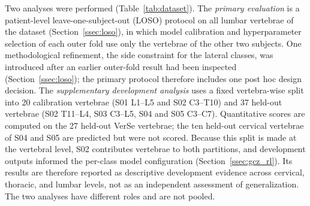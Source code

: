 \documentclass[5p,times,twocolumn,authoryear]{elsarticle}
\begin{document}
Two analyses were performed (Table~\ref{tab:dataset}). The \emph{primary evaluation} is a patient-level leave-one-subject-out (LOSO) protocol on all lumbar vertebrae of the dataset (Section~\ref{ssec:loso}), in which model calibration and hyperparameter selection of each outer fold use only the vertebrae of the other two subjects. One methodological refinement, the side constraint for the lateral classes, was introduced after an earlier outer-fold result had been inspected (Section~\ref{ssec:loso}); the primary protocol therefore includes one post hoc design decision. The \emph{supplementary development analysis} uses a fixed vertebra-wise split into 20 calibration vertebrae (S01 L1--L5 and S02 C3--T10) and 37 held-out vertebrae (S02 T11--L4, S03 C3--L5, S04 and S05 C3--C7). Quantitative scores are computed on the 27 held-out VerSe vertebrae; the ten held-out cervical vertebrae of S04 and S05 are predicted but were not scored. Because this split is made at the vertebral level, S02 contributes vertebrae to both partitions, and development outputs informed the per-class model configuration (Section~\ref{ssec:gcz_rl}). Its results are therefore reported as descriptive development evidence across cervical, thoracic, and lumbar levels, not as an independent assessment of generalization. The two analyses have different roles and are not pooled.
\end{document}
